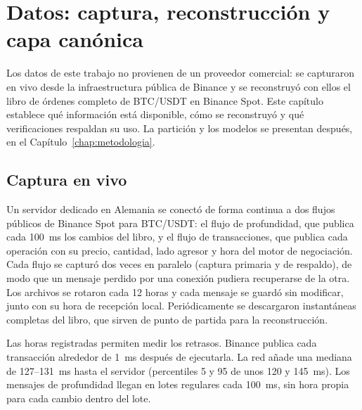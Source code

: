 \chapter{Datos: captura, reconstrucción y capa canónica}
\label{chap:datos}

Los datos de este trabajo no provienen de un proveedor comercial: se capturaron en vivo desde la infraestructura pública de Binance y se reconstruyó con ellos el libro de órdenes completo de BTC/USDT en Binance Spot. Este capítulo establece qué información está disponible, cómo se reconstruyó y qué verificaciones respaldan su uso. La partición y los modelos se presentan después, en el Capítulo~\ref{chap:metodologia}.

\section{Captura en vivo}
Un servidor dedicado en Alemania se conectó de forma continua a dos flujos públicos de Binance Spot para BTC/USDT: el flujo de profundidad, que publica cada 100~ms los cambios del libro, y el flujo de transacciones, que publica cada operación con su precio, cantidad, lado agresor y hora del motor de negociación. Cada flujo se capturó dos veces en paralelo (captura primaria y de respaldo), de modo que un mensaje perdido por una conexión pudiera recuperarse de la otra. Los archivos se rotaron cada 12 horas y cada mensaje se guardó sin modificar, junto con su hora de recepción local. Periódicamente se descargaron instantáneas completas del libro, que sirven de punto de partida para la reconstrucción.

Las horas registradas permiten medir los retrasos. Binance publica cada transacción alrededor de 1~ms después de ejecutarla. La red añade una mediana de 127--131~ms hasta el servidor (percentiles 5 y 95 de unos 120 y 145~ms). Los mensajes de profundidad llegan en lotes regulares cada 100~ms, sin hora propia para cada cambio dentro del lote.

